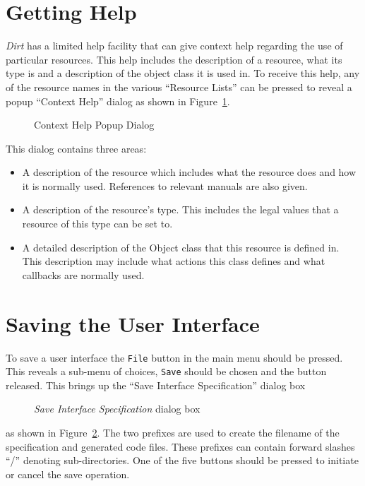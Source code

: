 \section{Getting Help}
\label{sec:help}
{\em Dirt} has a limited help facility that can give context help regarding
the use of particular resources.  This help includes the description of a
resource, what its type is and a description of the object class it is used
in.  To receive this help, any of the resource names in the various ``Resource
Lists'' can be pressed to reveal a popup ``Context Help'' dialog as shown in
Figure~\ref{fig:help-dialog}.
\begin{figure}
\centerline{}
\caption{Context Help Popup Dialog}
\label{fig:help-dialog}
\end{figure}
This dialog contains three areas:
\begin{itemize}
\item{}
A description of the resource which includes what the resource does and how
it is normally used.  References to relevant manuals are also given.
\item{}
A description of the resource's type.  This includes the legal values that a
resource of this type can be set to. 
\item{}
A detailed description of the Object class that this resource is defined in.
This description may include what actions this class defines and what
callbacks are normally used.
\end{itemize}

\section{Saving the User Interface}
\label{sec:saving}
To save a user interface the {\tt File} button in the main menu should be
pressed.  This reveals a sub-menu of choices, {\tt Save} should be
chosen and the button released.  This brings up the
``Save Interface Specification'' dialog box
\begin{figure}
\centerline{}
\caption{{\em Save Interface Specification} dialog box}
\label{fig:save-dialog}
\end{figure}
as shown in Figure~\ref{fig:save-dialog}.  The two prefixes are used to
create the filename of the specification and generated code files.
These prefixes can contain forward slashes ``/'' denoting sub-directories.
One of the five buttons should be pressed to initiate or cancel the save
operation.


